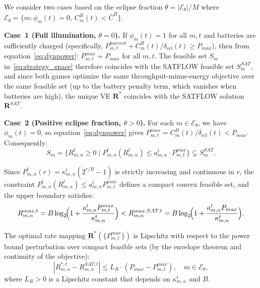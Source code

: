 \documentclass[journal]{IEEEtran}
\newcommand{\CB}{C^{B}}
\newcommand{\Pmax}{P_{max}}
\newcommand{\bfR}{\mathbf{R}}
\begin{document}
\begin{IEEEproof}
We consider two cases based on the eclipse fraction $\theta = |\mathcal{E}_\theta|/M$ where $\mathcal{E}_\theta = \{m : \phi_m(t)=0,\,
\CB_m(t) < \bar{C}^B\}$.

\smallskip
\noindent\textbf{Case~1 (Full illumination,
$\theta = 0$).} If $\phi_m(t) = 1$ for all $m, t$ and batteries are sufficiently charged (specifically, $P_{m,t}^{harvest} + \CB_m(t)/\delta_{\mathrm{ecl}}(t)
\geq \Pmax$), then from
equation~\eqref{eq:dynpower}: $P_{m,t}^{max} = \Pmax$ for all $m, t$. The feasible set $S_m$ in~\eqref{eq:strategy_space} therefore coincides with the SATFLOW feasible set $S_m^{SAT}$, and since both games optimize the same throughput-minus-energy objective over the same feasible set (up to the battery penalty term, which vanishes when batteries are high), the unique VE $\bfR^*$ coincides with the SATFLOW solution $\bfR^{SAT}$.

\smallskip
\noindent\textbf{Case~2 (Positive eclipse fraction,
$\theta > 0$).} For each $m \in \mathcal{E}_\theta$, we have $\phi_m(t) = 0$, so equation~\eqref{eq:dynpower} gives $P_{m,t}^{max} = \CB_m(t)/\delta_{\mathrm{ecl}}(t) < \Pmax$. Consequently:
\begin{equation}
    S_m = \bigl\{R_{m,n}^t \geq 0 \mid
    P_{m,n}^t(R_{m,n}^t) \leq
    a_{m,n}^t \cdot P_{m,t}^{max}\bigr\}
    \subsetneq
    S_m^{SAT}.
\end{equation}

Since $P_{m,n}^t(r) = \kappa_{m,n}^t(2^{r/B}-1)$ is strictly increasing and continuous in $r$, the constraint $P_{m,n}^t(R_{m,n}^t) \leq a_{m,n}^t P_{m,t}^{max}$ defines a compact convex feasible set, and the upper boundary satisfies:
\begin{equation}
    R_{m,n}^{max,t}
    = B\log_2\!\Bigl(1 +
    \frac{a_{m,n}^t P_{m,t}^{max}}%
    {\kappa_{m,n}^t}\Bigr)
    < R_{m,n}^{max,SAT,t}
    = B\log_2\!\Bigl(1 +
    \frac{a_{m,n}^t \Pmax}%
    {\kappa_{m,n}^t}\Bigr).
\end{equation}

The optimal rate mapping $\bfR^*(\{P_{m,t}^{max}\})$ is Lipschitz with respect to the power bound perturbation over compact feasible sets (by the envelope theorem and continuity of the objective):
\begin{equation}
    |R_{m,n}^{*,t} - R_{m,n}^{SAT,t}|
    \leq L_R \cdot (\Pmax - P_{m,t}^{max}),
    \quad m \in \mathcal{E}_\theta,
    \label{eq:lipschitz_rate}
\end{equation}
where $L_R > 0$ is a Lipschitz constant that depends on $\kappa_{m,n}^t$ and $B$.


\end{IEEEproof}
\end{document}
